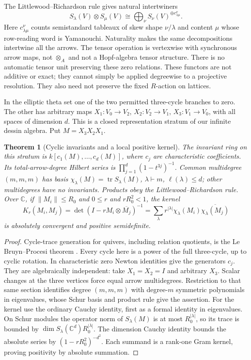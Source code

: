 \documentclass[11pt]{article}
\newtheorem{theorem}{Theorem}[section]
\theoremstyle{definition}\newtheorem{definition}[theorem]{Definition}
\theoremstyle{remark}\newtheorem{remark}[theorem]{Remark}
\newcommand{\C}{\mathbb C}\newcommand{\Z}{\mathbb Z}\newcommand{\R}{\mathbb R}
\DeclareMathOperator{\tr}{tr}\DeclareMathOperator{\Rea}{Re}
\begin{document}
The Littlewood--Richardson rule gives natural intertwiners
\[
 S_\lambda(V)\otimes S_\mu(V)\cong
 \bigoplus_\nu S_\nu(V)^{\oplus c_{\lambda\mu}^{\nu}}.
\]
Here $c_{\lambda\mu}^{\nu}$ counts semistandard tableaux of skew shape $\nu/\lambda$ and content $\mu$ whose row-reading word is Yamanouchi. Naturality makes the same decompositions intertwine all the arrows. The tensor operation is vertexwise with synchronous arrow maps, not $\otimes_A$ and not a Hopf-algebra tensor structure. There is no automatic tensor unit preserving these zero relations. These functors are not additive or exact; they cannot simply be applied degreewise to a projective resolution. They also need not preserve the fixed $R$-action on lattices.

In the elliptic theta set one of the two permitted three-cycle branches to zero. The other has arbitrary maps $X_1:V_0\to V_2$, $X_2:V_2\to V_1$, $X_3:V_1\to V_0$, with all spaces of dimension $d$. This is a closed representation stratum of our infinite dessin algebra. Put $M=X_3X_2X_1$.
\begin{theorem}[Cyclic invariants and a local positive kernel]\label{thm:schur}
The invariant ring on this stratum is $k[c_1(M),\ldots,c_d(M)]$, where $c_j$ are characteristic coefficients. Its total-arrow-degree Hilbert series is $\prod_{j=1}^d(1-t^{3j})^{-1}$. Common multidegree $(m,m,m)$ has basis $\chi_\lambda(M)=\tr S_\lambda(M)$, $\lambda\vdash m$, $\ell(\lambda)\le d$; other multidegrees have no invariants. Products obey the Littlewood--Richardson rule. Over $\C$, if $\|M_i\|\le R_0$ and $0\le r$ and $rR_0^2<1$, the kernel
\[
 K_r(M_i,M_j)=\det(I-rM_i\otimes\overline{M_j})^{-1}
 =\sum_\lambda r^{|\lambda|}\chi_\lambda(M_i)\overline{\chi_\lambda(M_j)}
\]
is absolutely convergent and positive semidefinite.
\end{theorem}
\begin{proof}
Cycle-trace generation for quivers, including relation quotients, is the Le Bruyn--Procesi theorem \cite{LeBruynProcesi,CrawYamagishi}. Every cycle here is a power of the full three-cycle, up to cyclic rotation. In characteristic zero Newton identities give the generators $c_j$. They are algebraically independent: take $X_1=X_2=I$ and arbitrary $X_3$. Scalar changes at the three vertices force equal arrow multidegrees. Restriction to that same section identifies degree $(m,m,m)$ with degree-$m$ symmetric polynomials in eigenvalues, whose Schur basis and product rule give the assertion. For the kernel use the ordinary Cauchy identity, first as a formal identity in eigenvalues. On Schur modules the operator norm of $S_\lambda(M)$ is at most $R_0^{|\lambda|}$, so its trace is bounded by $\dim S_\lambda(\C^d)R_0^{|\lambda|}$. The dimension Cauchy identity bounds the absolute series by $(1-rR_0^2)^{-d^2}$. Each summand is a rank-one Gram kernel, proving positivity by absolute summation.
\end{proof}
\end{document}
